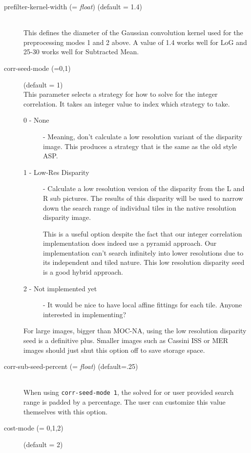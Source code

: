 \begin{description}
\item[prefilter-kernel-width \textnormal{\small{(= \emph{float})}} (default = 1.4)] \hfill \\
  This defines the diameter of the Gaussian convolution kernel used
  for the preprocessing modes 1 and 2 above. A value of 1.4 works
  well for LoG and 25-30 works well for Subtracted Mean.

\item[corr-seed-mode \textnormal{\small{(=0,1)}}] (default = 1) \hfill \\
  This parameter selects a strategy for how to solve for the integer
  correlation. It takes an integer value to index which strategy to
  take.
  \begin{description}
    \item[0 - None] - Meaning, don't calculate a low resolution
      variant of the disparity image. This produces a strategy that is
      the same as the old style ASP.
    \item[1 - Low-Res Disparity] - Calculate a low resolution version
      of the disparity from the L and R sub pictures. The results of
      this disparity will be used to narrow down the search range of
      individual tiles in the native resolution disparity image.

      This is a useful option despite the fact that our integer
      correlation implementation does indeed use a pyramid
      approach. Our implementation can't search infinitely into lower
      resolutions due to its independent and tiled nature. This low
      resolution disparity seed is a good hybrid approach.
    \item[2 - Not implemented yet] - It would be nice to have local
      affine fittings for each tile. Anyone interested in
      implementing?
  \end{description}

  For large images, bigger than MOC-NA, using the low resolution
  disparity seed is a definitive plus. Smaller images such as Cassini
  ISS or MER images should just shut this option off to save storage
  space.

\item[corr-sub-seed-percent \textnormal{\small{(= \emph{float})}} (default=.25)] \hfill \\
  When using \texttt{corr-seed-mode 1}, the solved for or user
  provided search range is padded by a percentage. The user can
  customize this value themselves with this option.

\item[cost-mode \textnormal{\small{(= 0,1,2)}}] (default = 2) \hfill \\


\end{description}
